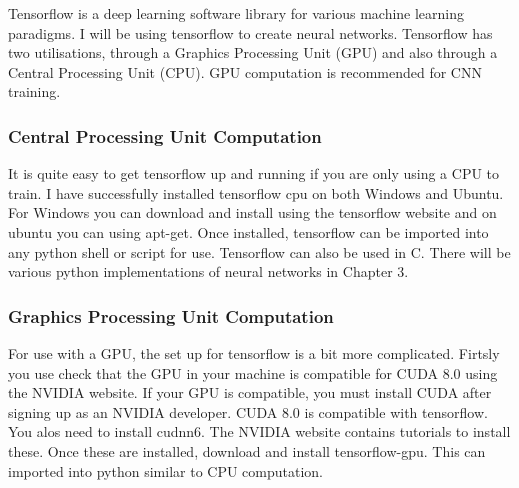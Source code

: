 Tensorflow is a deep learning software library for various machine learning paradigms. I will
be using tensorflow to create neural networks.
Tensorflow has two utilisations, through a Graphics Processing Unit (GPU) and
also through a Central Processing Unit (CPU).
GPU computation is recommended for CNN training. 

\subsubsection*{Central Processing Unit Computation}
It is quite easy to get tensorflow up and running if you are only using a CPU to
train. I have successfully installed tensorflow cpu on both Windows and Ubuntu.
For Windows you can download and install using the tensorflow website and on ubuntu you can
using apt-get. Once installed, tensorflow can be imported into any python shell
or script for use. Tensorflow can also be used in C. There will be various
python implementations of neural networks in Chapter 3.

\subsubsection*{Graphics Processing Unit Computation}
For use with a GPU, the set up for tensorflow is a bit more complicated. Firtsly
you use check that the GPU in your machine is compatible for CUDA 8.0 using the
NVIDIA website. If your GPU is compatible, you must install CUDA after signing
up as an NVIDIA developer. CUDA 8.0 is compatible with tensorflow. You alos need
to install cudnn6. The NVIDIA website contains tutorials to install these. Once
these are installed, download and install tensorflow-gpu. This can imported into
python similar to CPU computation.
